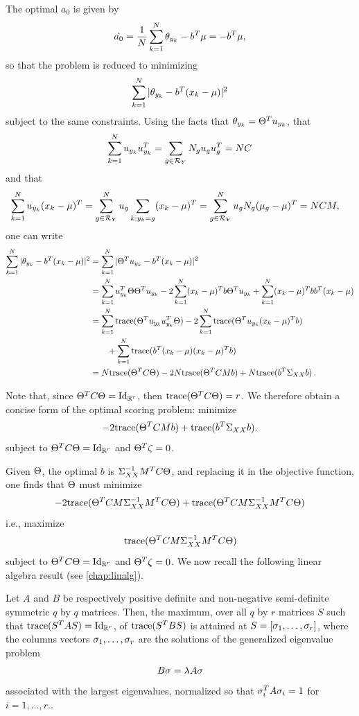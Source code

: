 The optimal ${a_0}$ is given by
\[
\hat{a_0} = \frac1N \sum_{k=1}^N \theta_{y_k} - b^T\mu = -b^T\mu,
\]
so that the problem is reduced to minimizing 
\[
\sum_{k=1}^N |\theta_{y_k} - b^T (x_k-\mu)|^2
\]
subject to the same constraints. Using the facts that $\theta_{y_k} = \Theta^T u_{y_k}$, that
\[
\sum_{k=1}^N u_{y_k}u_{y_k}^T = \sum_{g\in {\mathcal R}_Y} N_g u_{g}u_{g}^T = NC
\]
and that
\begin{align*}
\sum_{k=1}^N u_{y_k}(x_k-\mu)^T &= \sum_{g\in {\mathcal R}_Y}^N u_{g} \sum_{k: y_k = g} (x_k-\mu)^T
= \sum_{g\in {\mathcal R}_Y}^N u_{g} N_g (\mu_g - \mu)^T = NCM,
\end{align*}
one can write 
\[
\begin{aligned}
\sum_{k=1}^N |\theta_{y_k} - b^T (x_k-\mu)|^2 &= \sum_{k=1}^N |\Theta^T u_{y_k} - b^T (x_k-\mu)|^2 \\
&= \sum_{k=1}^N u_{y_k}^T \Theta \Theta^T u_{y_k} - 2 \sum_{k=1}^N (x_k-\mu)^T b\Theta^Tu_{y_k} + \sum_{k=1}^N (x_k-\mu)^T bb^T (x_k-\mu)\\
&= \sum_{k=1}^N {\mathrm{trace}}(\Theta^T u_{y_k}u_{y_k}^T \Theta) - 2 \sum_{k=1}^N {\mathrm{trace}}(\Theta^T u_{y_k} (x_k-\mu)^T b) \\
& \qquad + \sum_{k=1}^N {\mathrm{trace}}( b^T (x_k-\mu)(x_k-\mu)^T b)\\
&= N{\mathrm{trace}}(\Theta^TC\Theta) - 2N{\mathrm{trace}}(\Theta^TCMb) + N{\mathrm{trace}}(b^T\Sigma_{XX}b)\,.
\end{aligned}
\]

Note that, since $\Th^T C \Th= \Id[r]$, then ${\mathrm{trace}}(\Theta^TC\Theta)=r$. 
We therefore obtain a concise form of the optimal scoring problem: minimize
\[
- 2{\mathrm{trace}}(\Theta^TCMb) + {\mathrm{trace}}(b^T\Sigma_{XX}b).
\]
subject to $\Th^T C \Th= \Id[r]$ and $\Theta^T\zeta = 0$.

Given $\Theta$,  the optimal $b$ is  $\Sigma_{XX}^{-1} M^TC\Theta$, and replacing it in the objective function, one finds that $\Theta$ must minimize
\[
- 2{\mathrm{trace}}(\Theta^TCM\Sigma_{XX}^{-1} M^TC\Theta) + {\mathrm{trace}}(\Theta^TCM\Sigma_{XX}^{-1} M^TC\Theta)
\]
i.e., maximize
\[
{\mathrm{trace}}(\Theta^T CM\Sigma_{XX}^{-1} M^T C \Theta)
\]
subject to $\Th^T C \Th= \Id[r]$ and $\Theta^T\zeta = 0$.  We now recall the following linear algebra result (see \cref{chap:linalg}). 
\begin{proposition}
\label{prop:gen.eig}
Let $A$ and $B$ be respectively positive definite and non-negative semi-definite symmetric $q$ by $q$ matrices. Then, the maximum, over all $q$ by $r$ matrices $S$ such that $\trace(S^TAS) = \Id[r]$, of ${\mathrm{trace}}(S^TBS)$   is attained at $S = [\sigma_1, \ldots, \sigma_r]$, where the columns vectors $\sigma_1, \ldots, \sigma_r$ are the solutions of the generalized eigenvalue problem
\[
B\sigma = \lambda A\sigma
\]
associated with the largest eigenvalues, normalized so that $\sigma_i^T A \sigma_i = 1$ for $i=1, \ldots, r$..
\end{proposition}


